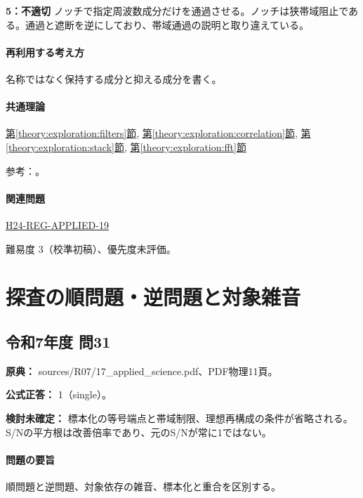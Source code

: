 \noindent\textbf{5：不適切} ノッチで指定周波数成分だけを通過させる。ノッチは狭帯域阻止である。通過と遮断を逆にしており、帯域通過の説明と取り違えている。\par

\paragraph{再利用する考え方} 名称ではなく保持する成分と抑える成分を書く。

\paragraph{共通理論} \hyperref[theory:exploration:filters]{第\ref*{theory:exploration:filters}節}, \hyperref[theory:exploration:correlation]{第\ref*{theory:exploration:correlation}節}, \hyperref[theory:exploration:stack]{第\ref*{theory:exploration:stack}節}, \hyperref[theory:exploration:fft]{第\ref*{theory:exploration:fft}節}

\par 参考：\cite{mit_signals2010,mit_moving2012,scipy_notch,scipy_fft,usgs_processing2000}。

\paragraph{関連問題} \hyperref[q:h24-reg-applied-19]{H24-REG-APPLIED-19}

\par 難易度 3（校準初稿）、優先度未評価。

\section{探査の順問題・逆問題と対象雑音}

\subsection{令和7年度 問31}
\label{q:r07-reg-applied-31}

\noindent\textbf{原典：} sources/R07/17\_applied\_science.pdf、PDF物理11頁。

\textbf{公式正答：} 1（single）。

\par\textbf{検討未確定：} 標本化の等号端点と帯域制限、理想再構成の条件が省略される。S/Nの平方根は改善倍率であり、元のS/Nが常に1ではない。

\paragraph{問題の要旨} 順問題と逆問題、対象依存の雑音、標本化と重合を区別する。

